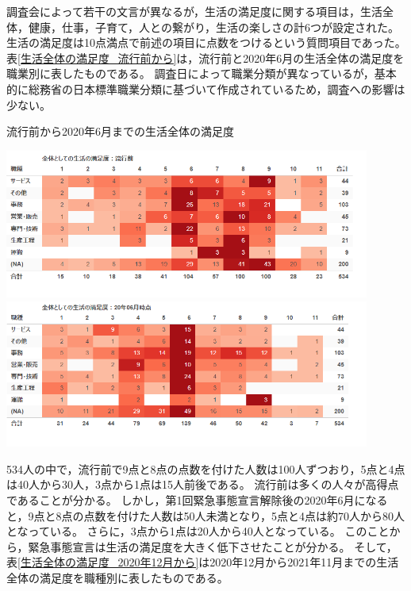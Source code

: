 \documentclass[paper={210mm,297mm},line_length=35zw,number_of_lines=31,head_space=30mm,gutter=40mm,baselineskip=2.0zw,headfoot_verticalposition=1.5zw]{jlreq}
\begin{document}
調査会によって若干の文言が異なるが，生活の満足度に関する項目は，生活全体，健康，仕事，子育て，人との繋がり，生活の楽しさの計6つが設定された。
生活の満足度は10点満点で前述の項目に点数をつけるという質問項目であった。
表\ref{生活全体の満足度_流行前から}は，流行前と2020年6月の生活全体の満足度を職業別に表したものである。
調査日によって職業分類が異なっているが，基本的に総務省の日本標準職業分類に基づいて作成されているため，調査への影響は少ない。\\

\begin{table}[H]
  \centering
  \caption{流行前から2020年6月までの生活全体の満足度}%
  \includegraphics[width=120mm]{../Figure/c05s01_table_全体の生活の満足度：00-流行前.png}
  \includegraphics[width=120mm]{../Figure/c05s01_table_全体の生活の満足度：R2-06.png}
  \label{生活全体の満足度_流行前から}
\end{table}

534人の中で，流行前で9点と8点の点数を付けた人数は100人ずつおり，5点と4点は40人から30人，3点から1点は15人前後である。
流行前は多くの人々が高得点であることが分かる。
しかし，第1回緊急事態宣言解除後の2020年6月になると，9点と8点の点数を付けた人数は50人未満となり，5点と4点は約70人から80人となっている。
さらに，3点から1点は20人から40人となっている。
このことから，緊急事態宣言は生活の満足度を大きく低下させたことが分かる。
そして，表\ref{生活全体の満足度_2020年12月から}は2020年12月から2021年11月までの生活全体の満足度を職種別に表したものである。\\
\end{document}
